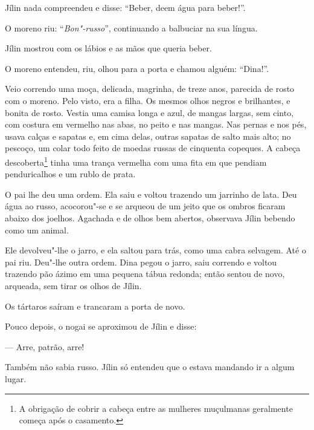 Jílin nada compreendeu e disse: ``Beber, deem água para beber!''.

O moreno riu: ``\emph{Bon"-russo}'', continuando a balbuciar na sua
língua.

Jílin mostrou com os lábios e as mãos que queria beber.

O moreno entendeu, riu, olhou para a porta e chamou alguém: ``Dina!''.

Veio correndo uma moça, delicada, magrinha, de treze anos, parecida de
rosto com o moreno. Pelo visto, era a filha. Os mesmos olhos negros e
brilhantes, e bonita de rosto. Vestia uma camisa longa e azul, de mangas
largas, sem cinto, com costura em vermelho nas abas, no peito e nas
mangas. Nas pernas e nos pés, usava calças e sapatas e, em cima delas,
outras sapatas de salto mais alto; no pescoço, um colar todo feito de
moedas russas de cinquenta copeques. A cabeça descoberta\footnote{A
  obrigação de cobrir a cabeça entre as mulheres muçulmanas geralmente
  começa após o casamento.} tinha uma trança vermelha com uma fita em
que pendiam penduricalhos e um rublo de prata.

O pai lhe deu uma ordem. Ela saiu e voltou trazendo um jarrinho de lata.
Deu água ao russo, acocorou"-se e se arqueou de um jeito que os ombros
ficaram abaixo dos joelhos. Agachada e de olhos bem abertos, observava
Jílin bebendo como um animal.

Ele devolveu"-lhe o jarro, e ela saltou para trás, como uma cabra
selvagem. Até o pai riu. Deu"-lhe outra ordem. Dina pegou o jarro, saiu
correndo e voltou trazendo pão ázimo em uma pequena tábua redonda; então
sentou de novo, arqueada, sem tirar os olhos de Jílin.

Os tártaros saíram e trancaram a porta de novo.

Pouco depois, o nogai se aproximou de Jílin e disse:

--- Arre, patrão, arre!

Também não sabia russo. Jílin só entendeu que o estava mandando ir a
algum lugar.

